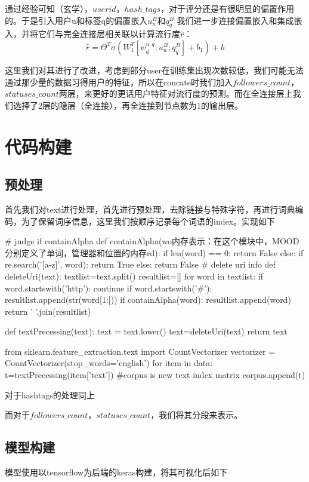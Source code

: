 \documentclass[a4paper, 12pt]{ctexart}
\begin{document}
通过经验可知（玄学），$userid$，$hash\_tags$，对于评分还是有很明显的偏置作用的。于是引入用户u和标签q的偏置嵌入$u_u^B$和$q_q^{B}$
我们进一步连接偏置嵌入和集成嵌入，并将它们与完全连接层相关联以计算流行度$\hat{r}$：
\[\hat{r}=\Theta^T\sigma(W_1^T[\psi_d^{u,q};u_u^B;q_q^B]+b_1)+b\]

这里我们对其进行了改进，考虑到部分user在训练集出现次数较低，我们可能无法通过那少量的数据习得用户的特征，所以在concate时我们加入$followers\_count$，$statuses\_count$两层，来更好的更话用户特征对流行度的预测。而在全连接层上我们选择了2层的隐层（全连接），再全连接到节点数为1的输出层。

\section{代码构建}
\subsection{预处理}
首先我们对text进行处理，首先进行预处理，去除链接与特殊字符，再进行词典编码，为了保留词序信息，这里我们按顺序记录每个词语的index。实现如下

\begin{python}
# judge if containAlpha
def containAlpha(wo内存表示：在这个模块中，MOOD分别定义了单词，管理器和位置的内存rd):   
    if len(word) == 0:  
        return False
    else:  
        if re.search('[a-z]', word):  
            return True  
        else:  
            return False
# delete uri info
def deleteUri(text):
	textlist=text.split()
	resultlist=[]
	for word in textlist:
		if word.startswith('http'):
			continue
		if word.startswith('#'):
			resultlist.append(str(word[1:]))
		if containAlpha(word):
			resultlist.append(word)
	return ' '.join(resultlist)

def textPrecessing(text):
	text = text.lower()
	text=deleteUri(text)
	return text

from sklearn.feature_extraction.text import CountVectorizer
vectorizer = CountVectorizer(stop_words='english')
for item in data:
	t=textPrecessing(item['text'])
	#corpus is new text index matrix
	corpus.append(t)
\end{python}

对于hashtags的处理同上

而对于$followers\_count$，$statuses\_count$，我们将其分段来表示。

\subsection{模型构建}
模型使用以tensorflow为后端的keras构建，将其可视化后如下
\end{document}
